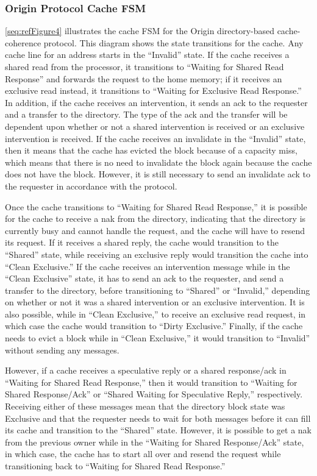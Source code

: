 \documentclass[letterpaper]{article}
\newcounter{Figure}
\begin{document}
\subsubsection{Origin Protocol Cache FSM}
\ref{seq:refFigure4} illustrates the cache FSM for the Origin directory-based cache-coherence protocol. This diagram shows the state transitions for the cache. Any cache line for an address starts in the ``Invalid'' state. If the cache receives a shared read from the processor, it transitions to ``Waiting for Shared Read Response'' and forwards the request to the home memory; if it receives an exclusive read instead, it transitions to ``Waiting for Exclusive Read Response.'' In addition, if the cache receives an intervention, it sends an ack to the requester and a transfer to the directory. The type of the ack and the transfer will be dependent upon whether or not a shared intervention is received or an exclusive intervention is received. If the cache receives an invalidate in the ``Invalid'' state, then it means that the cache has evicted the block because of a capacity miss, which means that there is no need to invalidate the block again because the cache does not have the block. However, it is still necessary to send an invalidate ack to the requester in accordance with the protocol.

Once the cache transitions to ``Waiting for Shared Read Response,'' it is possible for the cache to receive a nak from the directory, indicating that the directory is currently busy and cannot handle the request, and the cache will have to resend its request. If it receives a shared reply, the cache would transition to the ``Shared'' state, while receiving an exclusive reply would transition the cache into ``Clean Exclusive.'' If the cache receives an intervention message while in the ``Clean Exclusive'' state, it has to send an ack to the requester, and send a transfer to the directory, before transitioning to ``Shared'' or ``Invalid,'' depending on whether or not it was a shared intervention or an exclusive intervention. It is also possible, while in ``Clean Exclusive,'' to receive an exclusive read request, in which case the cache would transition to ``Dirty Exclusive.'' Finally, if the cache needs to evict a block while in ``Clean Exclusive,'' it would transition to ``Invalid'' without sending any messages.

However, if a cache receives a speculative reply or a shared response/ack in ``Waiting for Shared Read Response,'' then it would transition to ``Waiting for Shared Response/Ack'' or ``Shared Waiting for Speculative Reply,'' respectively. Receiving either of these messages mean that the directory block state was Exclusive and that the requester needs to wait for both messages before it can fill its cache and transition to the ``Shared'' state. However, it is possible to get a nak from the previous owner while in the ``Waiting for Shared Response/Ack'' state, in which case, the cache has to start all over and resend the request while transitioning back to ``Waiting for Shared Read Response.''
\end{document}
